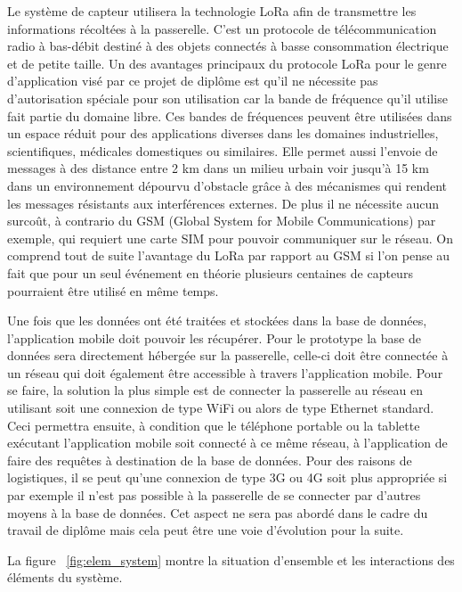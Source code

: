 Le système de capteur utilisera la technologie LoRa afin de transmettre les informations récoltées à la passerelle. C’est un protocole de télécommunication radio à bas-débit destiné à des objets connectés à basse consommation électrique et de petite taille. Un des avantages principaux du protocole LoRa pour le genre d’application visé par ce projet de diplôme est qu’il ne nécessite pas d’autorisation spéciale pour son utilisation car la bande de fréquence qu’il utilise fait partie du domaine libre. Ces bandes de fréquences peuvent être utilisées dans un espace réduit pour des applications diverses dans les domaines industrielles, scientifiques, médicales domestiques ou similaires. Elle permet aussi l'envoie de messages à des distance entre 2 km dans un milieu urbain voir jusqu’à 15 km dans un environnement dépourvu d’obstacle grâce à des mécanismes qui rendent les messages résistants aux interférences externes. De plus il ne nécessite aucun surcoût, à contrario du GSM (Global System for Mobile Communications) par exemple, qui requiert une carte SIM pour pouvoir communiquer sur le réseau. On comprend tout de suite l’avantage du LoRa par rapport au GSM si l’on pense au fait que pour un seul événement en théorie plusieurs centaines de capteurs pourraient être utilisé en même temps. 

Une fois que les données ont été traitées et stockées dans la base de données, l’application mobile doit pouvoir les récupérer. Pour le prototype la base de données sera directement hébergée sur la passerelle, celle-ci doit être connectée à un réseau qui doit également être accessible à travers l’application mobile. Pour se faire, la solution la plus simple est de connecter la passerelle au réseau en utilisant soit une connexion de type WiFi ou alors de type Ethernet standard. Ceci permettra ensuite, à condition que le téléphone portable ou la tablette exécutant l’application mobile soit connecté à ce même réseau, à l’application de faire des requêtes à destination de la base de données. Pour des raisons de logistiques, il se peut qu’une connexion de type 3G ou 4G soit plus appropriée si par exemple il n’est pas possible à la passerelle de se connecter par d’autres moyens à la base de données. Cet aspect ne sera pas abordé dans le cadre du travail de diplôme mais cela peut être une voie d’évolution pour la suite.

La figure ~\ref{fig:elem_system} montre la situation d’ensemble et les interactions des éléments du système.

